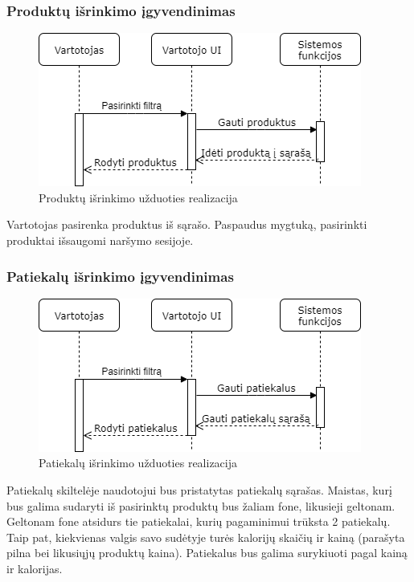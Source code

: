 \documentclass{VUMIFInfKursinis}
\begin{document}
\subsubsection{Produktų išrinkimo įgyvendinimas}

\begin{figure}[H]
    \centering
 \includegraphics[scale=0.6]{img/seqProd}
    \caption{Produktų išrinkimo užduoties realizacija}   %
    \label{img:mlp}
\end{figure}
\bigskip
Vartotojas pasirenka produktus iš sąrašo. Paspaudus mygtuką, pasirinkti produktai išsaugomi naršymo sesijoje.

\subsubsection{Patiekalų išrinkimo įgyvendinimas}

\begin{figure}[H]
    \centering
 \includegraphics[scale=0.6]{img/seqPat}
    \caption{Patiekalų išrinkimo užduoties realizacija}   %
    \label{img:mlp}
\end{figure}
\bigskip
Patiekalų skiltelėje naudotojui bus pristatytas patiekalų sąrašas. Maistas, kurį bus galima sudaryti iš pasirinktų produktų bus žaliam fone, likusieji geltonam. Geltonam fone atsidurs tie patiekalai, kurių pagaminimui trūksta 2 patiekalų. Taip pat, kiekvienas valgis savo sudėtyje turės kalorijų skaičių ir kainą (parašyta pilna bei likusiųjų produktų kaina). Patiekalus bus galima surykiuoti pagal kainą ir kalorijas.
\end{document}
